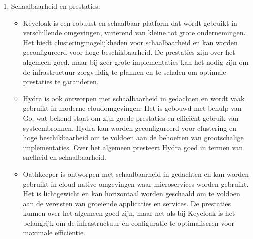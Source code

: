 \begin{enumerate}
  \item Schaalbaarheid en prestaties:
  \begin{itemize}
    \item Keycloak is een robuust en schaalbaar platform dat wordt gebruikt in verschillende omgevingen, variërend van kleine tot grote ondernemingen. Het biedt clusteringmogelijkheden voor schaalbaarheid en kan worden geconfigureerd voor hoge beschikbaarheid. De prestaties zijn over het algemeen goed, maar bij zeer grote implementaties kan het nodig zijn om de infrastructuur zorgvuldig te plannen en te schalen om optimale prestaties te garanderen.
    \item Hydra is ook ontworpen met schaalbaarheid in gedachten en wordt vaak gebruikt in moderne cloudomgevingen. Het is gebouwd met behulp van Go, wat bekend staat om zijn goede prestaties en efficiënt gebruik van systeembronnen. Hydra kan worden geconfigureerd voor clustering en hoge beschikbaarheid om te voldoen aan de behoeften van grootschalige implementaties. Over het algemeen presteert Hydra goed in termen van snelheid en schaalbaarheid.
    \item Oathkeeper is ontworpen met schaalbaarheid in gedachten en kan worden gebruikt in cloud-native omgevingen waar microservices worden gebruikt. Het is lichtgewicht en kan horizontaal worden geschaald om te voldoen aan de vereisten van groeiende applicaties en services. De prestaties kunnen over het algemeen goed zijn, maar net als bij Keycloak is het belangrijk om de infrastructuur en configuratie te optimaliseren voor maximale efficiëntie.
  \end{itemize}
  

\end{enumerate}
